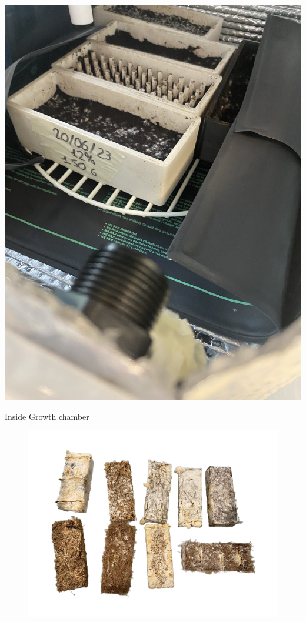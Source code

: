 \begin{marginfigure}
    \centering
    \includegraphics{images/IMG_3172.jpg}
    \caption{Inside Growth chamber}
    \label{fig:insidegrowth}
\end{marginfigure}

\begin{figure}[h]
    \centering
    \includegraphics{images/IMG_1790-removebg-preview.png}
    \caption{}
    \label{fig:donutandcup}
\end{figure} 


